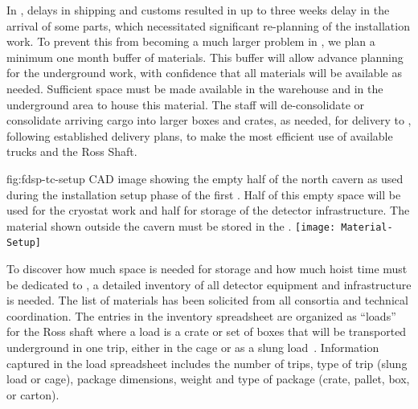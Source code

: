 In , delays in shipping and customs resulted in up to three weeks delay in the arrival of some parts, which necessitated significant re-planning of the installation work. To prevent this from becoming a much larger problem in , we plan a minimum one month buffer of materials. This buffer will allow advance planning for the underground work, %
with confidence that all materials will be available as needed. %
Sufficient space must be made available in the warehouse and in the underground area  to house this material. %
The  staff will de-consolidate or consolidate arriving cargo into larger boxes and crates, as needed, for  delivery to %
, following established %
delivery plans, to make the most efficient use of available trucks and the Ross Shaft. %

\begin{dunefigure}{fig:fdsp-tc-setup}
  {CAD image showing the empty half of the north cavern as used during the installation setup phase of the first .  Half of this empty space will be used for the cryostat work and half for storage of the detector infrastructure. The material shown outside the cavern must be stored in the .}
\texttt{[image: Material-Setup]}
\end{dunefigure}


To discover how much space is needed for storage and how much hoist time must be dedicated to , a detailed inventory of all detector equipment and  infrastructure is needed. The list of %
materials has been solicited from all consortia and technical coordination. The entries in the inventory spreadsheet are organized as ``loads'' for the Ross shaft where a load is a crate or set of boxes that will be transported underground in one trip, either in the %
cage or as a slung load~\cite{bib:docdb8426}. 
Information captured in the load spreadsheet includes the number of %
trips, type of trip (slung load or cage), package dimensions, weight and type of package (crate, pallet, box, or carton). 

